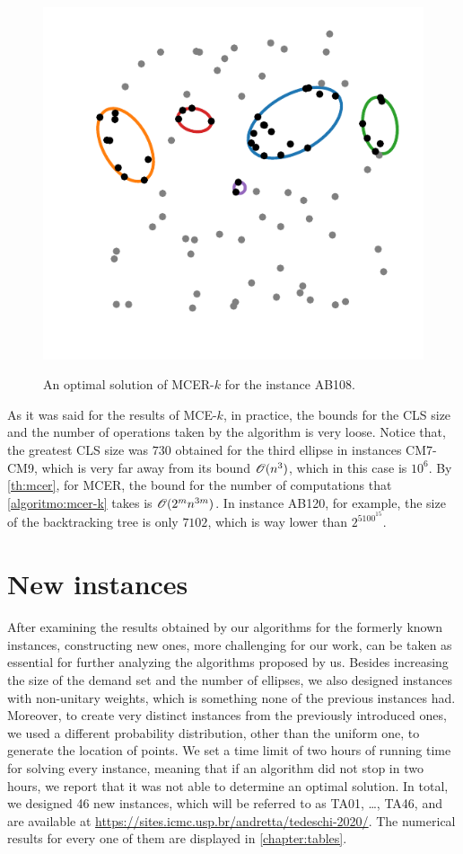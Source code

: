 \begin{figure}[!htb]
	\centering
	\caption{An optimal solution of MCER-$k$ for the instance AB108.}
	\includegraphics[scale=.8]{tex/figures/AB108}
	\fautor
	\label{fig:AB108}
\end{figure}

As it was said for the results of MCE-$k$, in practice, the bounds for the CLS size and the number of operations taken by the algorithm is very loose.
Notice that, the greatest CLS size was $730$ obtained for the third ellipse in instances CM7-CM9, which is very far away from its bound $\mathscr{O}(n^3)$, which in this case is $10^6$. By \autoref{th:mcer}, for MCER, the bound for the number of computations that \autoref{algoritmo:mcer-k} takes is $\mathscr{O}(2^mn^{3m})$. In instance AB120, for example, the size of the backtracking tree is only $7102$, which is way lower than $2^5100^{15}$.

\section{New instances}

After examining the results obtained by our algorithms for the formerly known instances, constructing new ones, more challenging for our work, can be taken as essential for further analyzing the algorithms proposed by us.
Besides increasing the size of the demand set and the number of ellipses, we also designed instances with non-unitary weights, which is something none of the previous instances had. 
Moreover, to create very distinct instances from the previously introduced ones, we used a different probability distribution, other than the uniform one, to generate the location of points.
We set a time limit of two hours of running time for solving every instance, meaning that if an algorithm did not stop in two hours, we report that it was not able to determine an optimal solution. 
In total, we designed 46 new instances, which will be referred to as TA01, \dots, TA46, and are available at \url{https://sites.icmc.usp.br/andretta/tedeschi-2020/}. The numerical results for every one of them are displayed in \autoref{chapter:tables}.

